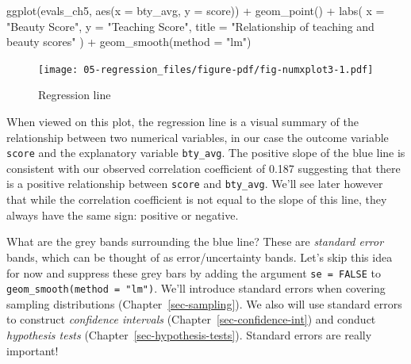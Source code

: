 \documentclass[
  letterpaper,
  DIV=11,
  numbers=noendperiod]{scrreprt}
\newenvironment{Shaded}{\begin{snugshade}}{\end{snugshade}}
\newcommand{\AttributeTok}[1]{\textcolor[rgb]{0.40,0.45,0.13}{#1}}
\newcommand{\FunctionTok}[1]{\textcolor[rgb]{0.28,0.35,0.67}{#1}}
\newcommand{\NormalTok}[1]{\textcolor[rgb]{0.00,0.23,0.31}{#1}}
\newcommand{\SpecialCharTok}[1]{\textcolor[rgb]{0.37,0.37,0.37}{#1}}
\newcommand{\StringTok}[1]{\textcolor[rgb]{0.13,0.47,0.30}{#1}}
\theoremstyle{definition}
\theoremstyle{remark}
\begin{document}
\begin{Shaded}
\begin{Highlighting}[]
\FunctionTok{ggplot}\NormalTok{(evals\_ch5, }\FunctionTok{aes}\NormalTok{(}\AttributeTok{x =}\NormalTok{ bty\_avg, }\AttributeTok{y =}\NormalTok{ score)) }\SpecialCharTok{+}
  \FunctionTok{geom\_point}\NormalTok{() }\SpecialCharTok{+}
  \FunctionTok{labs}\NormalTok{(}
    \AttributeTok{x =} \StringTok{"Beauty Score"}\NormalTok{, }
    \AttributeTok{y =} \StringTok{"Teaching Score"}\NormalTok{, }
    \AttributeTok{title =} \StringTok{"Relationship of teaching and beauty scores"}
\NormalTok{    ) }\SpecialCharTok{+}  
  \FunctionTok{geom\_smooth}\NormalTok{(}\AttributeTok{method =} \StringTok{"lm"}\NormalTok{)}
\end{Highlighting}
\end{Shaded}

\begin{figure}[H]

{\centering \texttt{[image: 05-regression\_files/figure-pdf/fig-numxplot3-1.pdf]}

}

\caption{\label{fig-numxplot3}Regression line}

\end{figure}

When viewed on this plot, the regression line is a visual summary of the
relationship between two numerical variables, in our case the outcome
variable \texttt{score} and the explanatory variable \texttt{bty\_avg}.
The positive slope of the blue line is consistent with our observed
correlation coefficient of 0.187 suggesting that there is a positive
relationship between \texttt{score} and \texttt{bty\_avg}. We'll see
later however that while the correlation coefficient is not equal to the
slope of this line, they always have the same sign: positive or
negative.

What are the grey bands surrounding the blue line? These are
\emph{standard error} bands, which can be thought of as
error/uncertainty bands. Let's skip this idea for now and suppress these
grey bars by adding the argument \texttt{se\ =\ FALSE} to
\texttt{geom\_smooth(method\ =\ "lm")}. We'll introduce standard errors
when covering sampling distributions (Chapter~\ref{sec-sampling}). We
also will use standard errors to construct \emph{confidence intervals}
(Chapter~\ref{sec-confidence-int}) and conduct \emph{hypothesis tests}
(Chapter~\ref{sec-hypothesis-tests}). Standard errors are really
important!
\end{document}
